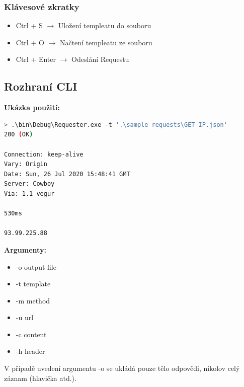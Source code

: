 \documentclass[a4paper]{article}
\begin{document}
        \subsubsection{Klávesové zkratky}
            \begin{itemize}
                \item Ctrl + S $\rightarrow$ Uložení templeatu do souboru
                \item Ctrl + O $\rightarrow$ Načtení templeatu ze souboru
                \item Ctrl + Enter $\rightarrow$ Odeslání Requestu
            \end{itemize}
    \subsection{Rozhraní CLI}
    \textbf{Ukázka použití:}
        \begin{lstlisting}[language=bash]
> .\bin\Debug\Requester.exe -t '.\sample requests\GET IP.json'
200 (OK)

Connection: keep-alive
Vary: Origin
Date: Sun, 26 Jul 2020 15:48:41 GMT
Server: Cowboy
Via: 1.1 vegur

530ms

93.99.225.88
        \end{lstlisting}
        \textbf{Argumenty:}
        \begin{itemize}
            \item[] -o    output file 
            \item[] -t    template 
            \item[] -m    method 
            \item[] -u    url 
            \item[] -c    content 
            \item[] -h    header 
        \end{itemize}
        V případě uvedení argumentu -o se ukládá pouze tělo
        odpovědi, nikolov celý záznam (hlavička atd.).
\end{document}
